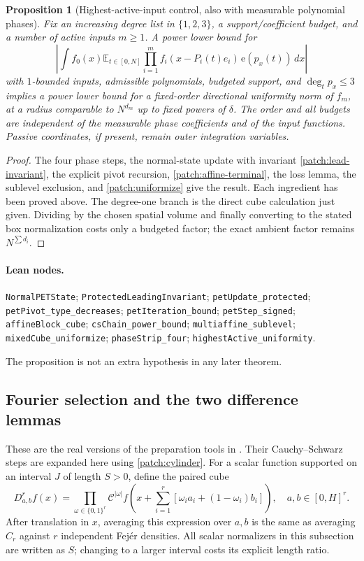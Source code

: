 \documentclass[11pt]{article}
\newtheorem{proposition}[proposition]{Proposition}
\theoremstyle{definition}
\newcommand{\ee}[1]{\mathrm e\!\left(#1\right)}
\newcommand{\pid}[1]{\nolinkurl{#1}}
\begin{document}
\begin{proposition}[Highest-active-input control, also with measurable polynomial phases]
\label{patch:highest-control}
Fix an increasing degree list in $\{1,2,3\}$, a support/coefficient budget, and a number of
active inputs $m\geq1$.  A power lower bound for
\[
 \left|\int f_0(x)\mathbb E_{t\in[0,N]}
           \prod_{i=1}^{m}f_i(x-P_i(t)e_i)\,\ee{p_x(t)}\,dx\right|
\]
with $1$-bounded inputs, admissible polynomials, budgeted support, and $\deg_t p_x\leq3$
implies a power lower bound for a fixed-order directional uniformity norm of $f_m$,
at a radius comparable to $N^{d_m}$ up to fixed powers of $\delta$.
The order and all budgets are independent of the measurable phase coefficients and of the
input functions.  Passive coordinates, if present, remain outer integration variables.
\end{proposition}
\begin{proof}
The four phase steps, the normal-state update with invariant \eqref{patch:lead-invariant},
the explicit pivot recursion, \eqref{patch:affine-terminal}, the loss lemma, the sublevel
exclusion, and \cref{patch:uniformize} give the result.  Each ingredient has been proved above.
The degree-one branch is the direct cube calculation just given.  Dividing by the chosen
spatial volume and finally converting to the stated box normalization costs only a budgeted
factor; the exact ambient factor remains $N^{\sum d_i}$.
\end{proof}
\paragraph{Lean nodes.}
\mbox{}\par
{\small\raggedright
\pid{NormalPETState}; \pid{ProtectedLeadingInvariant}; \pid{petUpdate_protected};
\pid{petPivot_type_decreases}; \pid{petIteration_bound}; \pid{petStep_signed};
\pid{affineBlock_cube}; \pid{csChain_power_bound}; \pid{multiaffine_sublevel};
\pid{mixedCube_uniformize}; \pid{phaseStrip_four}; \pid{highestActive_uniformity}.
\par}
The proposition is not an extra hypothesis in any later theorem.


\subsection{Fourier selection and the two difference lemmas}\label{patch:auxiliary-differences}
These are the real versions of the preparation tools in \cite[\S4.5.1]{KoszEtAl}.
Their Cauchy--Schwarz steps are expanded here using \cref{patch:cylinder}.
For a scalar function supported on an interval $J$ of length $S>0$, define the paired cube
\[
 D_{a,b}^{r}f(x)=\prod_{\omega\in\{0,1\}^r}\mathcal C^{|\omega|}
       f\left(x+\sum_{i=1}^r[\omega_i a_i+(1-\omega_i)b_i]\right),
 \quad a,b\in[0,H]^r.
\]
After translation in $x$, averaging this expression over $a,b$ is the same as averaging
$C_r$ against $r$ independent Fej\'er densities.  All scalar normalizers in this subsection
are written as $S$; changing to a larger interval costs its explicit length ratio.
\end{document}
